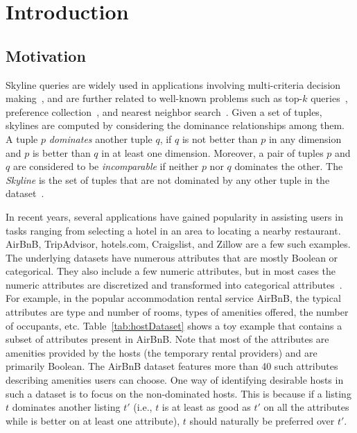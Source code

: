 \section{Introduction}\label{sec:inro}
\subsection{Motivation}
\label{sec:motivation}
Skyline queries are widely used in applications involving multi-criteria decision making~\cite{hwang2012multiple}, and are further related to well-known problems such as top-$k$ queries~\cite{ilyas2008survey,asudeh2016discovering}, preference collection~\cite{asudeh2015crowdsourcing}, and nearest neighbor search~\cite{kossmann2002}.
Given a set of tuples, skylines are computed by considering the dominance relationships among them. A tuple $p$ \textit{dominates} another tuple $q$, if $q$ is not better than $p$ in any dimension and $p$ is better than $q$ in at least one dimension. Moreover, a pair of tuples $p$ and $q$ are considered to be \textit{incomparable} if neither $p$ nor $q$ dominates the other. The {\em Skyline} is the set of tuples that are not dominated by any other tuple in the dataset~\cite{borzsony2001skyline}.

In recent years, several applications have gained popularity in assisting users in tasks ranging from selecting a hotel in an area to locating a nearby restaurant. AirBnB, TripAdvisor, hotels.com, Craigslist, and Zillow are a few such examples. The underlying datasets have numerous attributes that are mostly Boolean or categorical. 
They also include a few numeric attributes, but in most cases the numeric attributes are discretized and transformed into categorical attributes~\cite{morse2007efficient}.
For example, in the popular accommodation rental service AirBnB, the typical attributes are type and number of rooms, types of amenities offered, the number of occupants, etc. Table~\ref{tab:hostDataset} shows a toy example that contains a subset of attributes present in AirBnB. Note that most of the attributes are amenities provided by the hosts (the temporary rental providers) and are primarily Boolean. The AirBnB dataset features more than 40 such attributes describing amenities users can choose. One way of identifying desirable hosts in such a dataset is to focus on the non-dominated hosts. This is because if a listing $t$ dominates another listing $t'$ (i.e., $t$ is at least as good as $t'$ on all the attributes while is better on at least one attribute), $t$ should naturally be preferred over $t'$.

